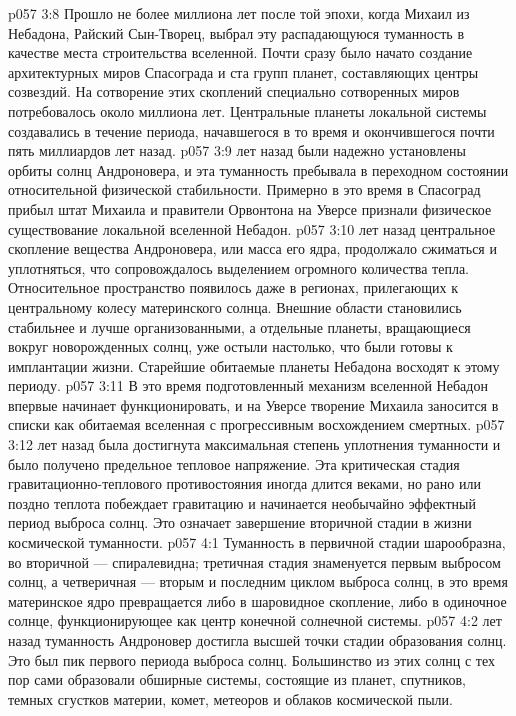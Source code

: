 \vs p057 3:8 Прошло не более миллиона лет после той эпохи, когда Михаил из Небадона, Райский Сын\hyp{}Творец, выбрал эту распадающуюся туманность в качестве места строительства вселенной. Почти сразу было начато создание архитектурных миров Спасограда и ста групп планет, составляющих центры созвездий. На сотворение этих скоплений специально сотворенных миров потребовалось около миллиона лет. Центральные планеты локальной системы создавались в течение периода, начавшегося в то время и окончившегося почти пять миллиардов лет назад.
\vs p057 3:9 \pc {} лет назад были надежно установлены орбиты солнц Андроновера, и эта туманность пребывала в переходном состоянии относительной физической стабильности. Примерно в это время в Спасоград прибыл штат Михаила и правители Орвонтона на Уверсе признали физическое существование локальной вселенной Небадон.
\vs p057 3:10 \pc {} лет назад центральное скопление вещества Андроновера, или масса его ядра, продолжало сжиматься и уплотняться, что сопровождалось выделением огромного количества тепла. Относительное пространство появилось даже в регионах, прилегающих к центральному колесу материнского солнца. Внешние области становились стабильнее и лучше организованными, а отдельные планеты, вращающиеся вокруг новорожденных солнц, уже остыли настолько, что были готовы к имплантации жизни. Старейшие обитаемые планеты Небадона восходят к этому периоду.
\vs p057 3:11 В это время подготовленный механизм вселенной Небадон впервые начинает функционировать, и на Уверсе творение Михаила заносится в списки как обитаемая вселенная с прогрессивным восхождением смертных.
\vs p057 3:12 \pc {} лет назад была достигнута максимальная степень уплотнения туманности и было получено предельное тепловое напряжение. Эта критическая стадия гравитационно\hyp{}теплового противостояния иногда длится веками, но рано или поздно теплота побеждает гравитацию и начинается необычайно эффектный период выброса солнц. Это означает завершение вторичной стадии в жизни космической туманности.
\vs p057 4:1 Туманность в первичной стадии шарообразна, во вторичной --- спиралевидна; третичная стадия знаменуется первым выбросом солнц, а четверичная --- вторым и последним циклом выброса солнц, в это время материнское ядро превращается либо в шаровидное скопление, либо в одиночное солнце, функционирующее как центр конечной солнечной системы.
\vs p057 4:2 \pc {} лет назад туманность Андроновер достигла высшей точки стадии образования солнц. Это был пик первого периода выброса солнц. Большинство из этих солнц с тех пор сами образовали обширные системы, состоящие из планет, спутников, темных сгустков материи, комет, метеоров и облаков космической пыли.
